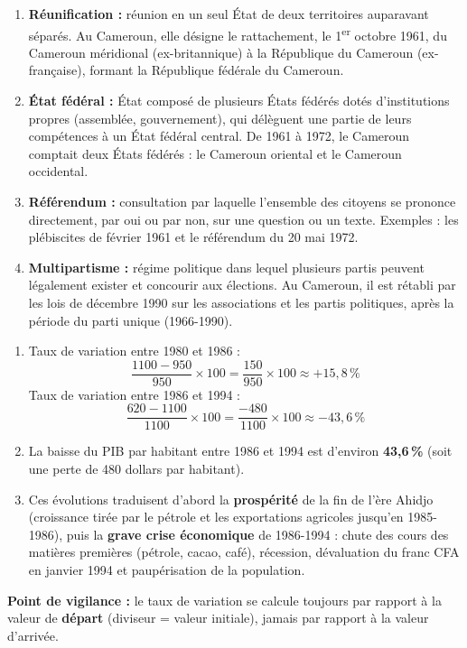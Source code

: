 \documentclass[11pt]{article}
\newcommand{\cle}[1]{{\popxbold\color{popdark}#1}}
\begin{document}
\begin{corrige}
\begin{enumerate}
\item \textbf{\cle{Réunification} :} réunion en un seul État de deux territoires auparavant séparés. Au Cameroun, elle désigne le rattachement, le 1\textsuperscript{er} octobre 1961, du Cameroun méridional (ex-britannique) à la République du Cameroun (ex-française), formant la République fédérale du Cameroun.
\item \textbf{\cle{État fédéral} :} État composé de plusieurs États fédérés dotés d'institutions propres (assemblée, gouvernement), qui délèguent une partie de leurs compétences à un État fédéral central. De 1961 à 1972, le Cameroun comptait deux États fédérés : le Cameroun oriental et le Cameroun occidental.
\item \textbf{\cle{Référendum} :} consultation par laquelle l'ensemble des citoyens se prononce directement, par oui ou par non, sur une question ou un texte. Exemples : les plébiscites de février 1961 et le référendum du 20 mai 1972.
\item \textbf{\cle{Multipartisme} :} régime politique dans lequel plusieurs partis peuvent légalement exister et concourir aux élections. Au Cameroun, il est rétabli par les lois de décembre 1990 sur les associations et les partis politiques, après la période du parti unique (1966-1990).
\end{enumerate}
\end{corrige}

\begin{corrige}
\begin{enumerate}
\item Taux de variation entre 1980 et 1986 :
\[ \frac{1100-950}{950}\times 100 = \frac{150}{950}\times 100 \approx +15{,}8\,\% \]
Taux de variation entre 1986 et 1994 :
\[ \frac{620-1100}{1100}\times 100 = \frac{-480}{1100}\times 100 \approx -43{,}6\,\% \]
\item La baisse du PIB par habitant entre 1986 et 1994 est d'environ \textbf{43,6\,\%} (soit une perte de 480 dollars par habitant).
\item Ces évolutions traduisent d'abord la \textbf{prospérité} de la fin de l'ère Ahidjo (croissance tirée par le pétrole et les exportations agricoles jusqu'en 1985-1986), puis la \textbf{grave crise économique} de 1986-1994 : chute des cours des matières premières (pétrole, cacao, café), récession, dévaluation du franc CFA en janvier 1994 et paupérisation de la population.
\end{enumerate}
\textbf{Point de vigilance :} le taux de variation se calcule toujours par rapport à la valeur de \textbf{départ} (diviseur = valeur initiale), jamais par rapport à la valeur d'arrivée.
\end{corrige}
\end{document}
